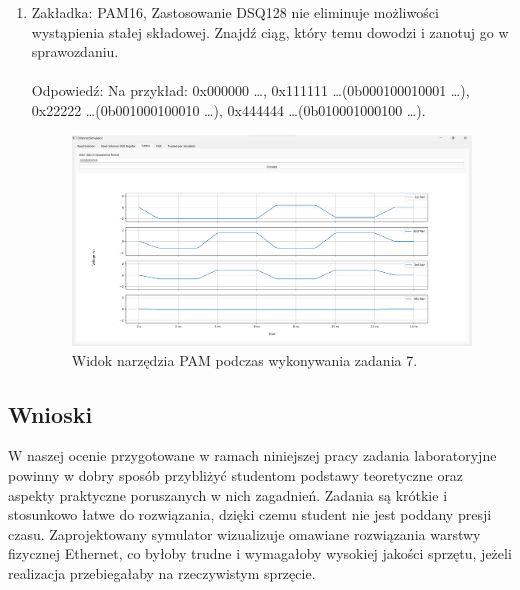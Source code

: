 \begin{enumerate}
    \item Zakładka: PAM16, Zastosowanie DSQ128 nie eliminuje możliwości wystąpienia stałej składowej. Znajdź ciąg, który
    temu dowodzi i zanotuj go w sprawozdaniu. \\ \\
    Odpowiedź: Na przykład: 0x000000 \dots, 0x111111 \dots (0b000100010001 \dots),\\0x22222 \dots (0b001000100010 \dots),
    0x444444 \dots (0b010001000100 \dots).

    

    \begin{figure}[H]
        \centering
        \includegraphics[width=\textwidth]{images/rozwiazania_7.png}
        \caption{Widok narzędzia PAM podczas wykonywania zadania 7.}
        \label{fig:rozwiazania_7}
    \end{figure}
    
    \end{enumerate}

\subsection*{Wnioski}

W naszej ocenie przygotowane w ramach niniejszej pracy zadania laboratoryjne powinny w dobry sposób przybliżyć studentom podstawy
teoretyczne oraz aspekty praktyczne poruszanych w nich zagadnień. Zadania są krótkie i stosunkowo łatwe do rozwiązania, dzięki czemu
student nie jest poddany presji czasu. Zaprojektowany symulator wizualizuje omawiane rozwiązania warstwy fizycznej Ethernet, co byłoby
trudne i wymagałoby wysokiej jakości sprzętu, jeżeli realizacja przebiegałaby na rzeczywistym sprzęcie.
